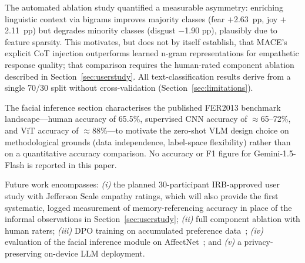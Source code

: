 \documentclass[sigconf, review=true]{acmart}
\begin{document}
The automated ablation study quantified a measurable asymmetry:
enriching linguistic context via bigrams improves majority
classes (fear $+$2.63~pp, joy $+$2.11~pp) but degrades minority
classes (disgust $-$1.90 pp), plausibly due to feature sparsity.
This motivates, but does not by itself establish, that MACE's
explicit CoT injection outperforms learned n-gram representations
for empathetic response quality; that comparison requires the
human-rated component ablation described in
Section~\ref{sec:userstudy}.
All text-classification results derive from a single 70/30 split
without cross-validation (Section~\ref{sec:limitations}).

The facial inference section characterises the published FER2013
benchmark landscape---human accuracy of 65.5\%, supervised
CNN accuracy of $\approx$65--72\%, and ViT accuracy of
$\approx$88\%---to motivate the zero-shot VLM design choice on
methodological grounds (data independence, label-space
flexibility) rather than on a quantitative accuracy comparison.
No accuracy or F1 figure for Gemini-1.5-Flash is reported in this
paper.

Future work encompasses: \textit{(i)} the planned 30-participant
IRB-approved user study with Jefferson Scale empathy ratings,
which will also provide the first systematic, logged measurement
of memory-referencing accuracy in place of the informal
observations in Section~\ref{sec:userstudy};
\textit{(ii)} full component ablation with human raters;
\textit{(iii)} DPO training on accumulated preference
data~\cite{rafailov2023dpo};
\textit{(iv)} evaluation of the facial inference module on
AffectNet~\cite{mollahosseini2019affectnet}; and
\textit{(v)} a privacy-preserving on-device LLM deployment.



\end{document}
